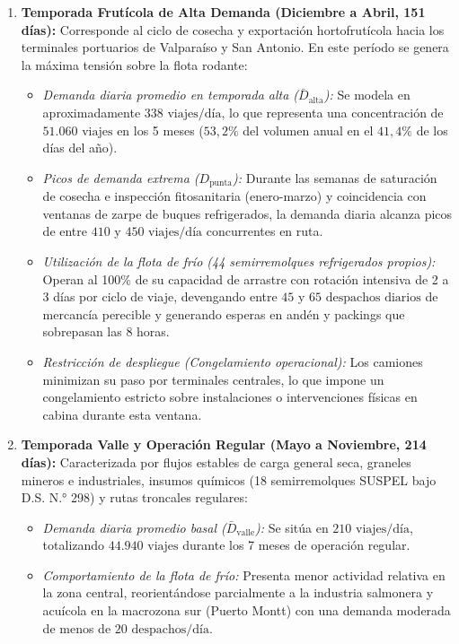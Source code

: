 \begin{enumerate}
  \item \textbf{Temporada Frutícola de Alta Demanda (Diciembre a Abril, 151 días):} Corresponde al ciclo de cosecha y exportación hortofrutícola hacia los terminales portuarios de Valparaíso y San Antonio. En este período se genera la máxima tensión sobre la flota rodante:
  \begin{itemize}
    \item \textit{Demanda diaria promedio en temporada alta ($\bar{D}_{\text{alta}}$):} Se modela en aproximadamente $338\text{ viajes/día}$, lo que representa una concentración de $51.060\text{ viajes}$ en los 5 meses ($53,2\%$ del volumen anual en el $41,4\%$ de los días del año).
    \item \textit{Picos de demanda extrema ($D_{\text{punta}}$):} Durante las semanas de saturación de cosecha e inspección fitosanitaria (enero-marzo) y coincidencia con ventanas de zarpe de buques refrigerados, la demanda diaria alcanza picos de entre $410$ y $450\text{ viajes/día}$ concurrentes en ruta.
    \item \textit{Utilización de la flota de frío (44 semirremolques refrigerados propios):} Operan al 100\% de su capacidad de arrastre con rotación intensiva de 2 a 3 días por ciclo de viaje, devengando entre $45$ y $65\text{ despachos diarios}$ de mercancía perecible y generando esperas en andén y packings que sobrepasan las 8 horas.
    \item \textit{Restricción de despliegue (Congelamiento operacional):} Los camiones minimizan su paso por terminales centrales, lo que impone un congelamiento estricto sobre instalaciones o intervenciones físicas en cabina durante esta ventana.
  \end{itemize}
  \item \textbf{Temporada Valle y Operación Regular (Mayo a Noviembre, 214 días):} Caracterizada por flujos estables de carga general seca, graneles mineros e industriales, insumos químicos (18 semirremolques SUSPEL bajo D.S. N.° 298) y rutas troncales regulares:
  \begin{itemize}
    \item \textit{Demanda diaria promedio basal ($\bar{D}_{\text{valle}}$):} Se sitúa en $210\text{ viajes/día}$, totalizando $44.940\text{ viajes}$ durante los 7 meses de operación regular.
    \item \textit{Comportamiento de la flota de frío:} Presenta menor actividad relativa en la zona central, reorientándose parcialmente a la industria salmonera y acuícola en la macrozona sur (Puerto Montt) con una demanda moderada de menos de $20\text{ despachos/día}$.

\end{itemize}
\end{enumerate}
